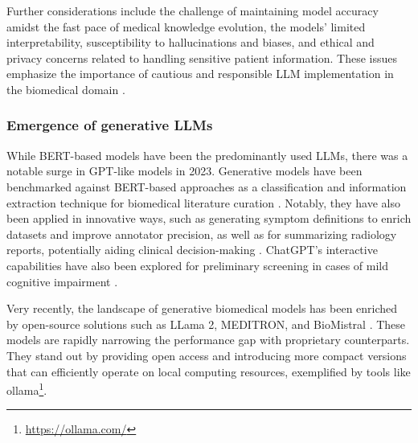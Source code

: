 \documentclass[fleqn,10pt]{olplainarticle}
\begin{document}
Further considerations include the challenge of maintaining model accuracy amidst the fast pace of medical knowledge evolution, the models' limited interpretability, susceptibility to hallucinations and biases, and ethical and privacy concerns related to handling sensitive patient information. These issues emphasize the importance of cautious and responsible LLM implementation in the biomedical domain \citep{ye2023cognitive,lin2023mind, thirunavukarasu2023large, wang2023decodingtrust,tian2024opportunities}.

\subsubsection*{Emergence of generative LLMs}
While BERT-based models have been the predominantly used LLMs, there was a notable surge in GPT-like models in 2023. Generative models have been benchmarked against BERT-based approaches as a classification and information extraction technique for biomedical literature curation \citep{patra2023automated, stepanov2023comparative,karkera2023leveraging}. Notably, they have also been applied in innovative ways, such as generating symptom definitions to enrich datasets and improve annotator precision, as well as for summarizing radiology reports, potentially aiding clinical decision-making \citep{kim2023symptomify, wu2023knowlab}. ChatGPT's interactive capabilities have also been explored for preliminary screening in cases of mild cognitive impairment \cite{wang2023text}.

Very recently, the landscape of generative biomedical models has been enriched by open-source solutions such as LLama 2, MEDITRON, and BioMistral  \citep{touvron2023llama, chen2023meditron, labrak2024biomistral}. These models are rapidly narrowing the performance gap with proprietary counterparts. They stand out by providing open access and introducing more compact versions that can efficiently operate on local computing resources, exemplified by tools like ollama\footnote{\url{https://ollama.com/}}. 

\end{document}
